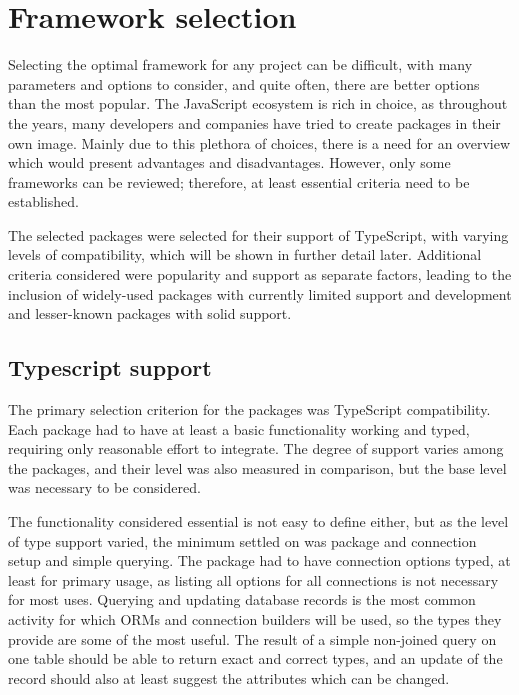 \chapter{Framework selection}

Selecting the optimal framework for any project can be difficult, with many
parameters and options to consider, and quite often, there are better options
than the most popular. The JavaScript ecosystem is rich in choice, as throughout
the years, many developers and companies have tried to create packages in their
own image. Mainly due to this plethora of choices, there is a need for an
overview which would present advantages and disadvantages. However, only some
frameworks can be reviewed; therefore, at least essential criteria need to be
established. 

The selected packages were selected for their support of TypeScript, with
varying levels of compatibility, which will be shown in further detail later.
Additional criteria considered were popularity and support as separate factors,
leading to the inclusion of widely-used packages with currently limited support
and development and lesser-known packages with solid support. 

\section{Typescript support}
The primary selection criterion for the packages was TypeScript compatibility.
Each package had to have at least a basic functionality working and typed,
requiring only reasonable effort to integrate. The degree of support varies
among the packages, and their level was also measured in comparison, but the
base level was necessary to be considered.

The functionality considered essential is not easy to define either, but as the
level of type support varied, the minimum settled on was package and connection
setup and simple querying. The package had to have connection options typed, at
least for primary usage, as listing all options for all connections is not
necessary for most uses. Querying and updating database records is the most
common activity for which ORMs and connection builders will be used, so the
types they provide are some of the most useful. The result of a simple
non-joined query on one table should be able to return exact and correct types,
and an update of the record should also at least suggest the attributes which
can be changed.

